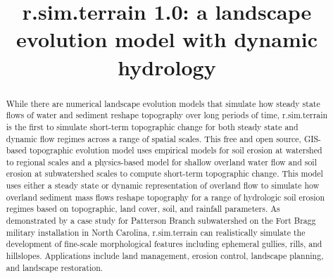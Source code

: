 \documentclass[gmd, manuscript]{copernicus}
\begin{document}
\title{\lowercase{r.sim.terrain 1.0}: a landscape evolution model with dynamic hydrology} 






\received{}
\pubdiscuss{}
\revised{}
\accepted{}
\published{}


\maketitle

\begin{abstract}
While there are numerical landscape evolution models
that simulate how steady state flows of water and sediment
reshape topography over long periods of time, 
r.sim.terrain is the first to 
simulate short-term topographic change 
for both steady state and dynamic flow regimes
across a range of spatial scales.
This free and open source, 
GIS-based topographic evolution model
uses empirical models for soil erosion
at watershed to regional scales 
and a physics-based model
for shallow overland water flow and soil erosion 
at subwatershed scales
to compute short-term topographic change. 
This model uses either a steady state or dynamic representation of overland flow
to simulate how overland sediment mass flows reshape topography
for a range of hydrologic soil erosion regimes
based on topographic, land cover, soil, and rainfall parameters. 
As demonstrated by a case study 
for Patterson Branch subwatershed
on the Fort Bragg military installation in North Carolina,
r.sim.terrain can realistically simulate the development of 
fine-scale morphological features including 
ephemeral gullies, rills, and hillslopes.
Applications include land management, erosion control,
landscape planning, and landscape restoration. 
\end{abstract}
\end{document}

